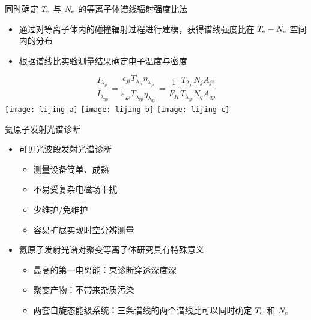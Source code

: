 \begin{frame}{同时确定 $T_{\rm e}$ 与 $N_{\rm e}$ 的等离子体谱线辐射强度比法}
	\begin{itemize}
  		\item 通过对等离子体内的碰撞辐射过程进行建模，获得谱线强度比在 $T_{\rm e}-N_{\rm e}$ 空间内的分布
  		\item 根据谱线比实验测量结果确定电子温度与密度
	\end{itemize}
\vspace*{-2em}
	\begin{center}
		$$
		\frac{I_{\lambda_{ji}}}{I_{\lambda_{qp}}}=	\frac{\epsilon_{ji}T_{\lambda_{ji}}\eta_{\lambda_{ji}}}{\epsilon_{qp}T_{\lambda_{qp}}\eta_{\lambda_{qp}}}
		=\frac{1}{F_R}\frac{T_{\lambda_{ji}}N_jA_{ji}}{T_{\lambda_{qp}}N_qA_{qp}}
		$$
	\texttt{[image: lijing-a]}
	\texttt{[image: lijing-b]}
	\texttt{[image: lijing-c]}
	\\
	\hfill{}
	\end{center}
\end{frame}


\begin{frame}{氦原子发射光谱诊断}
	\begin{itemize}
		\item 可见光波段发射光谱诊断
			\begin{itemize}
				\item 测量设备简单、成熟
				\item 不易受复杂电磁场干扰
				\item 少维护/免维护
				\item 容易扩展实现时空分辨测量
			\end{itemize}
		\bigskip
		\item 氦原子发射光谱对聚变等离子体研究具有特殊意义
			\begin{itemize}
				\item 最高的第一电离能：束诊断穿透深度深
				\item 聚变产物：不带来杂质污染
				\item 两套自旋态能级系统：三条谱线的两个谱线比可以同时确定 $T_{\rm e}$ 和 $N_{\rm e}$
			\end{itemize}
	\end{itemize}
\end{frame}


